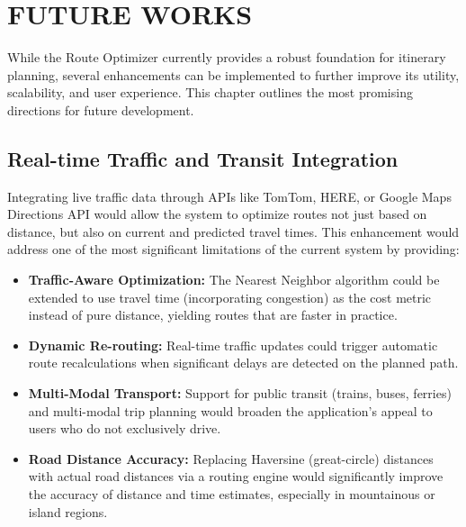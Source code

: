\chapter{FUTURE WORKS}
While the Route Optimizer currently provides a robust foundation for itinerary planning, several enhancements can be implemented to further improve its utility, scalability, and user experience. This chapter outlines the most promising directions for future development.

\section{Real-time Traffic and Transit Integration}
Integrating live traffic data through APIs like TomTom, HERE, or Google Maps Directions API would allow the system to optimize routes not just based on distance, but also on current and predicted travel times. This enhancement would address one of the most significant limitations of the current system by providing:
\begin{itemize}
    \item \textbf{Traffic-Aware Optimization:} The Nearest Neighbor algorithm could be extended to use travel time (incorporating congestion) as the cost metric instead of pure distance, yielding routes that are faster in practice.
    \item \textbf{Dynamic Re-routing:} Real-time traffic updates could trigger automatic route recalculations when significant delays are detected on the planned path.
    \item \textbf{Multi-Modal Transport:} Support for public transit (trains, buses, ferries) and multi-modal trip planning would broaden the application's appeal to users who do not exclusively drive.
    \item \textbf{Road Distance Accuracy:} Replacing Haversine (great-circle) distances with actual road distances via a routing engine would significantly improve the accuracy of distance and time estimates, especially in mountainous or island regions.
\end{itemize}

